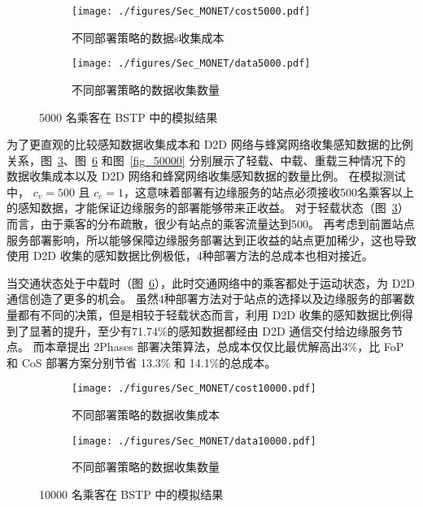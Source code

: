 \begin{figure}[!b]
  \centering
  \begin{subfigure}[b]{0.45\linewidth}
    \texttt{[image: ./figures/Sec\_MONET/cost5000.pdf]}
    \label{fig_cost5000}
    \vspace{-2em}
    \caption{不同部署策略的数据s收集成本}
  \end{subfigure}
  \begin{subfigure}[b]{0.45\linewidth}
    \texttt{[image: ./figures/Sec\_MONET/data5000.pdf]}
    \label{fig_data5000}
    \vspace{-2em}
    \caption{不同部署策略的数据收集数量}
  \end{subfigure}
    \vspace{-0.5em}
    \caption{5000 名乘客在 BSTP 中的模拟结果}
  \label{fig_5000}
\end{figure}

为了更直观的比较感知数据收集成本和 D2D 网络与蜂窝网络收集感知数据的比例关系，图~\ref{fig_5000}、图~\ref{fig_10000} 和图~\ref{fig_50000} 分别展示了轻载、中载、重载三种情况下的数据收集成本以及 D2D 网络和蜂窝网络收集感知数据的数量比例。
在模拟测试中， $c_v = 500$ 且 $c_c = 1$，这意味着部署有边缘服务的站点必须接收500名乘客以上的感知数据，才能保证边缘服务的部署能够带来正收益。
对于轻载状态（图~\ref{fig_5000}）而言，由于乘客的分布疏散，很少有站点的乘客流量达到500。
再考虑到前置站点服务部署影响，所以能够保障边缘服务部署达到正收益的站点更加稀少，这也导致使用 D2D 收集的感知数据比例极低，4种部署方法的总成本也相对接近。


当交通状态处于中载时（图~\ref{fig_10000}），此时交通网络中的乘客都处于运动状态，为 D2D 通信创造了更多的机会。
虽然4种部署方法对于站点的选择以及边缘服务的部署数量都有不同的决策，但是相较于轻载状态而言，利用 D2D 收集的感知数据比例得到了显著的提升，至少有71.74\%的感知数据都经由 D2D 通信交付给边缘服务节点。
而本章提出 2\-Phases 部署决策算法，总成本仅仅比最优解高出3\%，比 FoP 和 CoS 部署方案分别节省 13.3\% 和 14.1\%的总成本。

\begin{figure}[!h]
  \centering
  \begin{subfigure}[b]{0.45\linewidth}
    \texttt{[image: ./figures/Sec\_MONET/cost10000.pdf]}
    \label{fig_cost10000}
    \vspace{-2em}
    \caption{不同部署策略的数据收集成本}
  \end{subfigure}
  \begin{subfigure}[b]{0.45\linewidth}
    \texttt{[image: ./figures/Sec\_MONET/data10000.pdf]}
    \label{fig_data10000}
    \vspace{-2em}
    \caption{不同部署策略的数据收集数量}
  \end{subfigure}
    \vspace{-0.5em}
    \caption{10000 名乘客在 BSTP 中的模拟结果}
  \label{fig_10000}
\end{figure}

